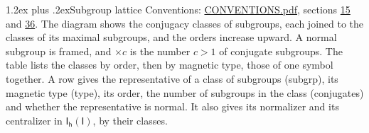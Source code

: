 \documentclass[10pt,a4paper]{article}
\makeatletter
\renewcommand\section{\@startsection{section}{1}{\z@}{-3ex plus -1ex minus -.2ex}%
  {1.2ex plus .2ex}{\normalfont\large\sffamily\bfseries\color{parttitle}}}
\numberwithin{equation}{section}
\newcommand{\grp}[1]{\mathsf{#1}}
\makeatother
\begin{document}
\section{Subgroup lattice}\label{s:subgroups}
Conventions: \href{../../CONVENTIONS.pdf}{CONVENTIONS.pdf}, sections \href{../../../rotation/CONVENTIONS.pdf\#conv.15}{15} and \href{../../CONVENTIONS.pdf\#conv.36}{36}.
The diagram shows the conjugacy classes of subgroups, each joined to the classes of its maximal subgroups, and the orders increase upward. \label{n:index.conjugates.c}\label{n:mark.conjugates}A normal subgroup is framed, and ${\times}c$ is the number $c > 1$ of conjugate subgroups. The table lists the classes by order, then by magnetic type, those of one symbol together. \label{n:head.subgroup}\label{n:head.magnetic.type}\label{n:head.order}\label{n:head.conjugates}\label{n:head.normal}A row gives the representative of a class of subgroups (subgrp), its magnetic type (type), its order, the number of subgroups in the class (conjugates) and whether the representative is normal. \label{n:head.normalizer}\label{n:head.centralizer}It also gives its normalizer and its centralizer in $\grp{I_{h}}(\grp{I})$, by their classes. 
\end{document}
